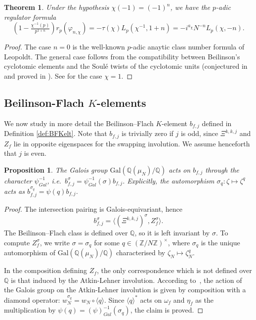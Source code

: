 \documentclass[11pt, a4paper, reqno]{amsart}
\theoremstyle{definition}
\theoremstyle{plain}
\newtheorem{theorem}[definition]{Theorem}
\newtheorem{proposition}[definition]{Proposition}
\theoremstyle{remark}
\newcommand{\numberset}{\mathbb}
\newcommand{\Q}{\numberset{Q}}
\newcommand{\Z}{\numberset{Z}}
\newcommand{\gal}[2]{\mathrm{Gal}({#1}/{#2})}
\newcommand{\cBF}{\Xi}
\begin{document}
  \begin{theorem}
   \label{thm:syntomic-regulator-beilinson-element}
   Under the hypothesis $\chi(-1)=(-1)^n$, we have the $p$-adic regulator formula
   \begin{equation}
    \label{eq:syntomic-regulator-beilinson-element}
    \left(1-\tfrac{\chi^{-1}(p)}{p^{1+n}}\right) r_p(\varphi_{n, \chi})= -\tau(\chi) L_p(\chi^{-1}, 1+n) = -i^{a_\chi}N^{-n} L_p(\chi, -n).
   \end{equation}
  \end{theorem}

  \begin{proof}
   The case $n = 0$ is the well-known $p$-adic anaytic class number formula of Leopoldt. The general case follows from the compatibility between Beilinson's cyclotomic elements and the Soul\'e twists of the cyclotomic units (conjectured in \cite[Conjecture 6.2]{blochkato90} and proved in \cite{huberwildeshaus}). See \cite[\S 4.2]{perrinriou95} for the case $\chi = 1$.
  \end{proof}

 \subsection{Beilinson-Flach $K$-elements}
  
  We now study in more detail the Beilinson--Flach $K$-element $b_{f, j}$ defined in Definition \ref{def:BFKelt}. Note that $b_{f, j}$ is trivially zero if $j$ is odd, since $\Xi^{k, k, j}$ and $Z_f$ lie in opposite eigenspaces for the swapping involution. We assume henceforth that $j$ is even.

  \begin{proposition}
   \label{prop:galois-action}
   The Galois group $\gal{\Q(\mu_N)}{\Q}$ acts on $b_{f, j}$ through the character $\psi_{Gal}^{-1}$, i.e.\ $b_{f, j}^{\sigma} = \psi_{Gal}^{-1}(\sigma)b_{f, j}$. Explicitly, the automorphism $\sigma_q \colon \zeta \mapsto \zeta^q$ acts as $b_{f, j}^{\sigma_q} = \psi(q)b_{f, j}$.
  \end{proposition}

  \begin{proof}
   The intersection pairing is Galois-equivariant, hence
   \[
    b_{f, j}^{\sigma} = \langle (\cBF^{k,k,j})^{\sigma}, Z_f^{\sigma} \rangle.
   \]
   The Beilinson--Flach class is defined over $\Q$, so it is left invariant by $\sigma$. To compute $Z_f^{\sigma}$, we write $\sigma = \sigma_q$ for some $q\in(\Z/N\Z)^{\times}$, where $\sigma_q$ is the unique automorphism of $\gal{\Q(\mu_N)}{\Q}$ characterised by $\zeta_N \mapsto \zeta_N^q$.

   In the composition defining $Z_f$, the only correspondence which is not defined over $\Q$ is that induced by the Atkin-Lehner involution. According to~\cite[3.5.2]{ohta95}, the action of the Galois group on the Atkin-Lehner involution is given by composition with a diamond operator: $w_N^{\sigma_q} = w_N \circ \langle q \rangle$. Since $\langle q \rangle^*$ acts on $\omega_f$ and $\eta_f$ as the multiplication by $\psi(q) = (\psi)_{Gal}^{-1}(\sigma_q)$, the claim is proved.
  \end{proof}
\end{document}
